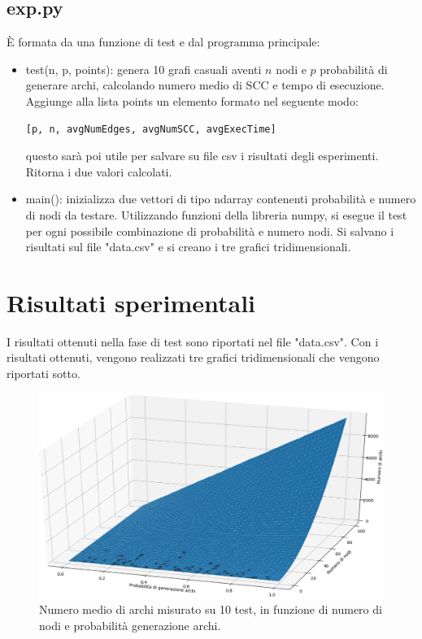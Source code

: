 \documentclass[]{article}
\begin{document}
\subsection*{exp.py}
È formata da una funzione di test e dal programma principale:
\begin{itemize}
\item test(n, p, points): genera 10 grafi casuali aventi $n$ nodi e $p$ probabilità di generare archi, calcolando numero medio di SCC e tempo di esecuzione. Aggiunge alla lista points un elemento formato nel seguente modo: 
\begin{verbatim}
[p, n, avgNumEdges, avgNumSCC, avgExecTime]
\end{verbatim}
questo sarà poi utile per salvare su file csv i risultati degli esperimenti. Ritorna i due valori calcolati.
\item main(): inizializza due vettori di tipo ndarray contenenti probabilità e numero di nodi da testare. Utilizzando funzioni della libreria numpy, si esegue il test per ogni possibile combinazione di probabilità e numero nodi. Si salvano i risultati sul file "data.csv" e si creano i tre grafici tridimensionali.
\end{itemize}

\section{Risultati sperimentali}

I risultati ottenuti nella fase di test sono riportati nel file "data.csv". Con i risultati ottenuti, vengono realizzati tre grafici tridimensionali che vengono riportati sotto.

\begin{center}
\begin{figure}[H]
	\includegraphics[width=\linewidth]{grafici/numEdges.png}
	\caption{Numero medio di archi misurato su 10 test, in funzione di numero di nodi e probabilità generazione archi.}
	\label{imgNumeroArchi}
\end{figure}
\end{center}
\end{document}
